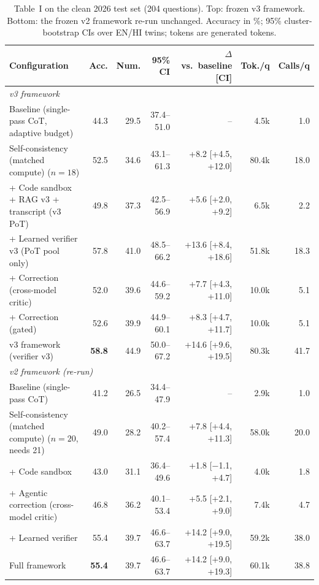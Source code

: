 \begin{table}[!t]
\centering
\footnotesize
\caption{Table~I on the clean 2026 test set (204 questions). Top: frozen v3 framework. Bottom: the frozen v2 framework re-run unchanged. Accuracy in \%; 95\% cluster-bootstrap CIs over EN/HI twins; tokens are generated tokens.}
\label{tab:t26}
\setlength{\tabcolsep}{3.5pt}
\begin{tabular}{lrrrrrr}
\toprule
Configuration & Acc. & Num. & 95\% CI & $\Delta$ vs.\ baseline [CI] & Tok./q & Calls/q \\
\midrule
\multicolumn{7}{l}{\emph{v3 framework}} \\
Baseline (single-pass CoT, adaptive budget) & 44.3 & 29.5 & 37.4--51.0 & -- & 4.5k & 1.0 \\
Self-consistency (matched compute) ($n{=}18$) & 52.5 & 34.6 & 43.1--61.3 & +8.2 [+4.5, +12.0] & 80.4k & 18.0 \\
+ Code sandbox + RAG v3 + transcript (v3 PoT) & 49.8 & 37.3 & 42.5--56.9 & +5.6 [+2.0, +9.2] & 6.5k & 2.2 \\
+ Learned verifier v3 (PoT pool only) & 57.8 & 41.0 & 48.5--66.2 & +13.6 [+8.4, +18.6] & 51.8k & 18.3 \\
+ Correction (cross-model critic) & 52.0 & 39.6 & 44.6--59.2 & +7.7 [+4.3, +11.0] & 10.0k & 5.1 \\
+ Correction (gated) & 52.6 & 39.9 & 44.9--60.1 & +8.3 [+4.7, +11.7] & 10.0k & 5.1 \\
v3 framework (verifier v3) & \textbf{58.8} & 44.9 & 50.0--67.2 & +14.6 [+9.6, +19.5] & 80.3k & 41.7 \\
\midrule
\multicolumn{7}{l}{\emph{v2 framework (re-run)}} \\
Baseline (single-pass CoT) & 41.2 & 26.5 & 34.4--47.9 & -- & 2.9k & 1.0 \\
Self-consistency (matched compute) ($n{=}20$, needs 21) & 49.0 & 28.2 & 40.2--57.4 & +7.8 [+4.4, +11.3] & 58.0k & 20.0 \\
+ Code sandbox & 43.0 & 31.1 & 36.4--49.6 & +1.8 [$-$1.1, +4.7] & 4.0k & 1.8 \\
+ Agentic correction (cross-model critic) & 46.8 & 36.2 & 40.1--53.4 & +5.5 [+2.1, +9.0] & 7.4k & 4.7 \\
+ Learned verifier & 55.4 & 39.7 & 46.6--63.7 & +14.2 [+9.0, +19.5] & 59.2k & 38.0 \\
Full framework & \textbf{55.4} & 39.7 & 46.6--63.7 & +14.2 [+9.0, +19.3] & 60.1k & 38.8 \\
\bottomrule
\end{tabular}
\end{table}
